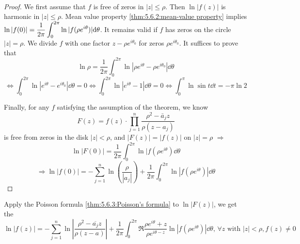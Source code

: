 \begin{proof}
    We first assume that  $ f  $ is free of zeros in  $ |z| \leq \rho $. Then  $ \ln |f(z)|  $ is harmonic in  $ |z| \leq \rho $. Mean value property \ref{thm:5.6.2:mean-value property} implies  $ \ln|f(0)|=\displaystyle\frac{1}{2\pi }\int_0^{2\pi} \ln |f(\rho e^{i\theta})| \mathrm{d}\theta $. It remains valid if  $  f  $ has zeros on the circle  $ |z|=\rho $. We divide  $ f  $ with one factor  $ z-\rho e^{i\theta_0} $ for zeros  $ \rho e^{i\theta_0} $. It suffices to prove that 
    \[\ln \rho=\frac{1}{2\pi}\int_0^{2\pi}\ln|\rho e^{i\theta}-\rho e^{i\theta_0}|\dd\theta\]
    \[\Leftrightarrow\int_0^{2\pi}\ln|e^{i\theta}-e^{i\theta_0}|\dd\theta=0\Leftrightarrow\int_0^{2\pi}\ln|e^{i\theta}-1|\dd\theta=0\Leftrightarrow\int_0^{\pi}\ln\sin t\dd t=-\pi \ln 2\]
    
    Finally, for any  $ f  $ satisfying the assumption of the theorem, we know 
    \begin{equation}
        F(z)=f(z)\cdot\prod_{j=1}^n\frac{\rho^2-\bar{a}_jz}{\rho(z-a_j)}
    \end{equation}
    is free from zeros in the disk  $ |z|<\rho $, and  $ |F(z)|=|f(z)|  $ on  $ |z|=\rho $ $ \Rightarrow $
    \[\ln|F(0)|=\frac{1}{2\pi}\int_0^{2\pi}\ln|f(\rho e^{i\theta})\dd\theta\]
    \[\Rightarrow \ln|f(0)|=-\sum_{j=1}^n\ln\left(\frac{\rho}{|a_j|}\right)+\frac{1}{2\pi}\int_0^{2\pi}\ln|f(\rho e^{i\theta})|\dd\theta\]  
\end{proof}
\begin{remark}
    Apply the Poisson formula \ref{thm:5.6.3:Poisson's formula} to  $ \ln|F(z)| $, we get the  
    \begin{equation}\label{eq:5.3.1:Poisson-Jensen formula}
        \ln|f(z)|=-\sum_{j=1}^n\ln\left|\frac{\rho^2-\overline{a_j}z}{\rho(z-a)}\right|+\frac{1}{2\pi}\int_0^{2\pi}\Re\frac{\rho e^{i\theta}+z}{\rho e^{i\theta-z}}\ln|f(\rho e^{i\theta})|\dd\theta,\,\forall z\text{ with }|z|<\rho,f(z)\neq 0
    \end{equation}
\end{remark}
